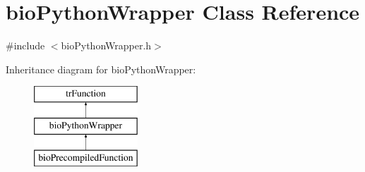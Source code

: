 \hypertarget{classbio_python_wrapper}{}\section{bio\+Python\+Wrapper Class Reference}
\label{classbio_python_wrapper}


{\ttfamily \#include $<$bio\+Python\+Wrapper.\+h$>$}

Inheritance diagram for bio\+Python\+Wrapper\+:\begin{figure}[H]
\begin{center}
\leavevmode
\includegraphics[height=3.000000cm]{classbio_python_wrapper}
\end{center}
\end{figure}

